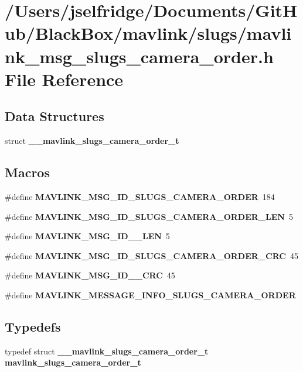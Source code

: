 \section{/\+Users/jselfridge/\+Documents/\+Git\+Hub/\+Black\+Box/mavlink/slugs/mavlink\+\_\+msg\+\_\+slugs\+\_\+camera\+\_\+order.h File Reference}
\label{mavlink__msg__slugs__camera__order_8h}
\subsection*{Data Structures}
\begin{DoxyCompactItemize}
\item 
struct \textbf{ \+\_\+\+\_\+mavlink\+\_\+slugs\+\_\+camera\+\_\+order\+\_\+t}
\end{DoxyCompactItemize}
\subsection*{Macros}
\begin{DoxyCompactItemize}
\item 
\#define \textbf{ M\+A\+V\+L\+I\+N\+K\+\_\+\+M\+S\+G\+\_\+\+I\+D\+\_\+\+S\+L\+U\+G\+S\+\_\+\+C\+A\+M\+E\+R\+A\+\_\+\+O\+R\+D\+ER}~184
\item 
\#define \textbf{ M\+A\+V\+L\+I\+N\+K\+\_\+\+M\+S\+G\+\_\+\+I\+D\+\_\+\+S\+L\+U\+G\+S\+\_\+\+C\+A\+M\+E\+R\+A\+\_\+\+O\+R\+D\+E\+R\+\_\+\+L\+EN}~5
\item 
\#define \textbf{ M\+A\+V\+L\+I\+N\+K\+\_\+\+M\+S\+G\+\_\+\+I\+D\+\_\+\_\+\+L\+EN}~5
\item 
\#define \textbf{ M\+A\+V\+L\+I\+N\+K\+\_\+\+M\+S\+G\+\_\+\+I\+D\+\_\+\+S\+L\+U\+G\+S\+\_\+\+C\+A\+M\+E\+R\+A\+\_\+\+O\+R\+D\+E\+R\+\_\+\+C\+RC}~45
\item 
\#define \textbf{ M\+A\+V\+L\+I\+N\+K\+\_\+\+M\+S\+G\+\_\+\+I\+D\+\_\+\_\+\+C\+RC}~45
\item 
\#define \textbf{ M\+A\+V\+L\+I\+N\+K\+\_\+\+M\+E\+S\+S\+A\+G\+E\+\_\+\+I\+N\+F\+O\+\_\+\+S\+L\+U\+G\+S\+\_\+\+C\+A\+M\+E\+R\+A\+\_\+\+O\+R\+D\+ER}
\end{DoxyCompactItemize}
\subsection*{Typedefs}
\begin{DoxyCompactItemize}
\item 
typedef struct \textbf{ \+\_\+\+\_\+mavlink\+\_\+slugs\+\_\+camera\+\_\+order\+\_\+t} \textbf{ mavlink\+\_\+slugs\+\_\+camera\+\_\+order\+\_\+t}
\end{DoxyCompactItemize}


